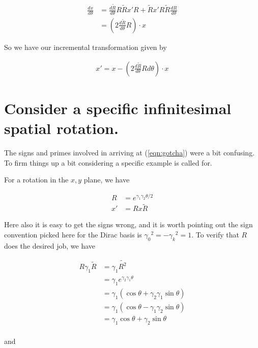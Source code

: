 \begin{align*}
\frac{dx}{d\theta}
&= \frac{d \tilde{R}}{d\theta} R \tilde{R} x' R + \tilde{R} x' R \tilde{R} \frac{d {R}}{d\theta}  \\
&= \left(2 \frac{d \tilde{R}}{d\theta} R \right) \cdot x
\end{align*}

So we have our incremental transformation given by

\begin{align}\label{eqn:gotcha}
x'= x - \left(2 \frac{d \tilde{R}}{d\theta} R d\theta \right) \cdot x
\end{align}


\section{Consider a specific infinitesimal spatial rotation.}

The signs and primes involved in arriving at (\ref{eqn:gotcha}) were a bit confusing.  To firm things up a bit considering a specific example is called for.

For a rotation in the $x,y$ plane, we have

\begin{align}
R &= e^{\gamma_1 \gamma_2 \theta/2} \\
x' &= R x \tilde{R}
\end{align}

Here also it is easy to get the signs wrong, and it is worth pointing out the sign convention picked here for the Dirac basis is ${\gamma_0}^2 = -{\gamma_k}^2 = 1$.  To verify that $R$ does the desired job, we have

\begin{align*}
R \gamma_1 \tilde{R}
&=
\gamma_1 \tilde{R^2} \\
&=
\gamma_1 e^{\gamma_2 \gamma_1 \theta} \\
&=
\gamma_1 (\cos\theta + \gamma_2 \gamma_1 \sin\theta) \\
&=
\gamma_1 (\cos\theta - \gamma_1 \gamma_2 \sin\theta) \\
&=
\gamma_1 \cos\theta + \gamma_2 \sin\theta \\
\end{align*}

and 

